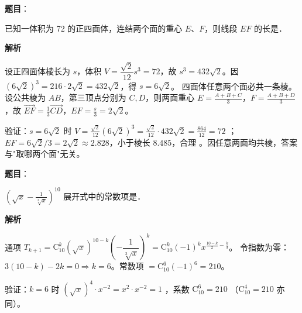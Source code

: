 \begin{answer}

\textbf{题目}：

已知一体积为 72 的正四面体，连结两个面的重心 $E$、$F$，则线段 $EF$ 的长是\gkblank{}．

\textbf{解析}

设正四面体棱长为 $s$，体积 $V=\dfrac{\sqrt2}{12}s^3=72$，故 $s^3=432\sqrt2$。因 $(6\sqrt2)^3=216\cdot2\sqrt2=432\sqrt2$，得 $s=6\sqrt2$。
四面体任意两个面必共一条棱。设公共棱为 $AB$，第三顶点分别为 $C,D$，则两面重心 $E=\frac{A+B+C}{3}$，$F=\frac{A+B+D}{3}$，故 $\overrightarrow{EF}=\frac13\overrightarrow{CD}$，$EF=\frac{s}{3}=2\sqrt2$。

验证：$s=6\sqrt2$ 时 $V=\frac{\sqrt2}{12}(6\sqrt2)^3=\frac{\sqrt2}{12}\cdot432\sqrt2=\frac{864}{12}=72$ ；$EF=6\sqrt2/3=2\sqrt2\approx2.828$，小于棱长 $8.485$，合理 。因任意两面均共棱，答案与"取哪两个面"无关。


\end{answer}
\begin{answer}

\textbf{题目}：

$\left(\sqrt{x} - \frac{1}{\sqrt[3]{x}}\right)^{10}$ 展开式中的常数项是\gkblank{}．

\textbf{解析}

通项 $T_{k+1}=\mathrm C_{10}^k(\sqrt x)^{10-k}\left(-\dfrac{1}{\sqrt[3]{x}}\right)^{k}=\mathrm C_{10}^k(-1)^k x^{\frac{10-k}{2}-\frac{k}{3}}$。
令指数为零：$3(10-k)-2k=0\Rightarrow k=6$。常数项 $=\mathrm C_{10}^6(-1)^6=210$。

验证：$k=6$ 时 $(\sqrt x)^4\cdot x^{-2}=x^2\cdot x^{-2}=1$ ，系数 $\mathrm C_{10}^6=210$ （$\mathrm C_{10}^4=210$ 亦同）。


\end{answer}
